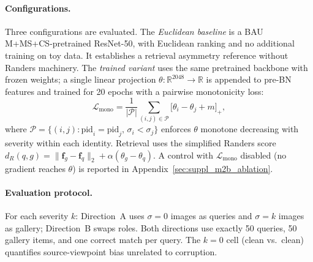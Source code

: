 \paragraph{Configurations.}
Three configurations are evaluated. The \emph{Euclidean baseline} is a BAU M+MS+CS-pretrained ResNet-50, with Euclidean ranking and no additional training on toy data. It establishes a retrieval asymmetry reference without Randers machinery. The \emph{trained variant} uses the same pretrained backbone with frozen weights; a single linear projection $\theta\!:\!\mathbb{R}^{2048}\!\to\!\mathbb{R}$ is appended to pre-BN features and trained for 20 epochs with a pairwise monotonicity loss:
\begin{equation}
    \mathcal{L}_{\mathrm{mono}} = \frac{1}{|\mathcal{P}|}\sum_{(i,j)\in\mathcal{P}} \bigl[\theta_i - \theta_j + m\bigr]_+,
    \label{eq:l_mono}
\end{equation}
where $\mathcal{P}\!=\!\{(i,j): \mathrm{pid}_i\!=\!\mathrm{pid}_j,\, \sigma_i\!<\!\sigma_j\}$ enforces $\theta$ monotone decreasing with severity within each identity. Retrieval uses the simplified Randers score $d_R(q,g)=\|\mathbf{f}_g-\mathbf{f}_q\|_2+\alpha(\theta_g-\theta_q)$. A control with $\mathcal{L}_{\mathrm{mono}}$ disabled (no gradient reaches $\theta$) is reported in Appendix~\ref{sec:suppl_m2b_ablation}.

\paragraph{Evaluation protocol.}
For each severity $k$: Direction~A uses $\sigma\!=\!0$ images as queries and $\sigma\!=\!k$ images as gallery; Direction~B swaps roles. Both directions use exactly 50 queries, 50 gallery items, and one correct match per query. The $k\!=\!0$ cell (clean vs.\ clean) quantifies source-viewpoint bias unrelated to corruption.

\begin{table}[t]
  \centering
  \caption{Euclidean baseline results for the balanced bidirectional evaluation on ToyCorruption (50 identities, single seed). Direction~A: clean query ($\sigma{=}0$) vs.\ corrupted gallery ($\sigma{=}k$); Direction~B reverses roles. Both directions: 50 queries, 50 gallery items, 1 correct match per query. $\Delta{=}\mathrm{mAP}_A{-}\mathrm{mAP}_B$.}
  \label{tab:toy_balanced_baseline}
\end{table}

